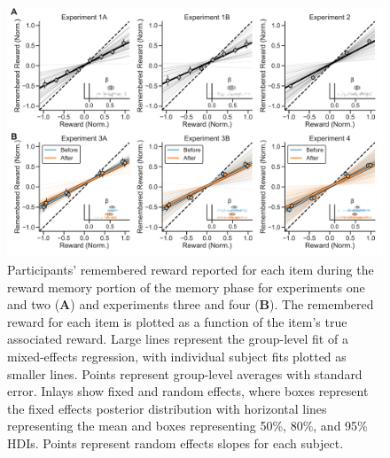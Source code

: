 \documentclass[10pt,letterpaper]{article}
\begin{document}
 \clearpage
\begin{figure}[h]
    \centering
    \includegraphics[width=1
    \textwidth]{figures/FigureS2.pdf}
    \caption{Participants' remembered reward reported for each item during the reward memory portion of the memory phase for experiments one and two (\textbf{A}) and experiments three and four (\textbf{B}). The remembered reward for each item is plotted as a function of the item's true associated reward. Large lines represent the group-level fit of a mixed-effects regression, with individual subject fits plotted as smaller lines. Points represent group-level averages with standard error. Inlays show fixed and random effects, where boxes represent the fixed effects posterior distribution with horizontal lines representing the mean and boxes representing 50\%, 80\%, and 95\% HDIs. Points represent random effects slopes for each subject.}
    \label{fig:suppFig2}
\end{figure}
\end{document}
